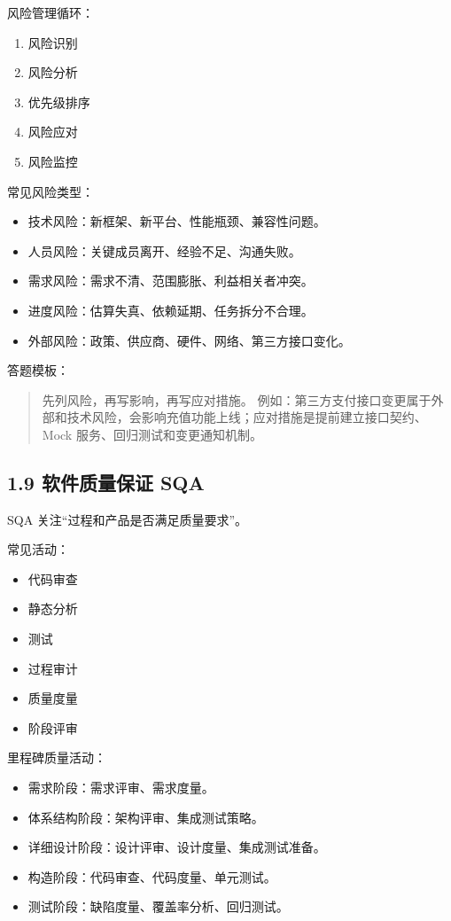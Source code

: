 \documentclass[UTF8,zihao=-4]{ctexart}
\begin{document}
风险管理循环：

\begin{enumerate}
\item 风险识别
\item 风险分析
\item 优先级排序
\item 风险应对
\item 风险监控
\end{enumerate}

常见风险类型：

\begin{itemize}
\item 技术风险：新框架、新平台、性能瓶颈、兼容性问题。
\item 人员风险：关键成员离开、经验不足、沟通失败。
\item 需求风险：需求不清、范围膨胀、利益相关者冲突。
\item 进度风险：估算失真、依赖延期、任务拆分不合理。
\item 外部风险：政策、供应商、硬件、网络、第三方接口变化。
\end{itemize}

答题模板：

\begin{quote}
先列风险，再写影响，再写应对措施。  
例如：第三方支付接口变更属于外部和技术风险，会影响充值功能上线；应对措施是提前建立接口契约、Mock 服务、回归测试和变更通知机制。
\end{quote}

\subsection{1.9 软件质量保证 SQA}

SQA 关注“过程和产品是否满足质量要求”。

常见活动：

\begin{itemize}
\item 代码审查
\item 静态分析
\item 测试
\item 过程审计
\item 质量度量
\item 阶段评审
\end{itemize}

里程碑质量活动：

\begin{itemize}
\item 需求阶段：需求评审、需求度量。
\item 体系结构阶段：架构评审、集成测试策略。
\item 详细设计阶段：设计评审、设计度量、集成测试准备。
\item 构造阶段：代码审查、代码度量、单元测试。
\item 测试阶段：缺陷度量、覆盖率分析、回归测试。
\end{itemize}
\end{document}
